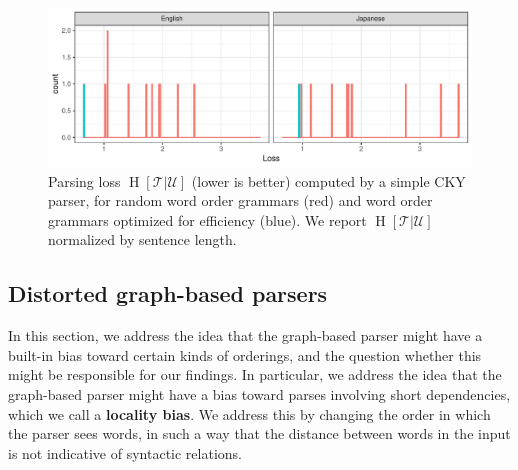 \documentclass[10pt,twoside,lineno]{article}
\newcommand{\key}[1]{\textbf{#1}}
\newcommand{\utterance}{\mathcal{U}}
\newcommand{\tree}{\mathcal{T}}
\begin{document}
\begin{figure}
    \centering
    \includegraphics[scale=.7]{../results/cky/cky-parse.pdf} 
	\caption{Parsing loss $\operatorname{H}[\tree|\utterance]$ (lower is better) computed by a simple CKY parser, for random word order grammars (red) and word order grammars optimized for efficiency (blue). We report $\operatorname{H}[\tree|\utterance]$ normalized by sentence length.}
    \label{fig:cky-parser}
\end{figure}



\subsection{Distorted graph-based parsers}
\label{sec:distorted}

In this section, we address the idea that the graph-based parser might have a built-in bias toward certain kinds of orderings, and the question whether this might be responsible for our findings.
In particular, we address the idea that the graph-based parser might have a bias toward parses involving short dependencies, which we call a \key{locality bias}. 
We address this by changing the order in which the parser sees words, in such a way that the distance between words in the input is not indicative of syntactic relations.


\end{document}

